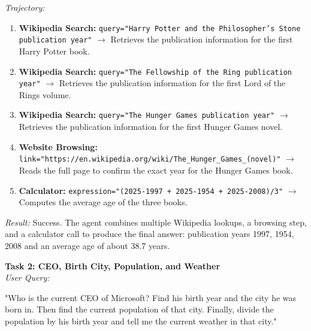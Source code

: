 \documentclass{article}
\begin{document}
\textit{Trajectory:}
\begin{enumerate}
    \item \textbf{Wikipedia Search:} \texttt{query="Harry Potter and the Philosopher's Stone publication year"} $\rightarrow$ Retrieves the publication information for the first Harry Potter book.
    \item \textbf{Wikipedia Search:} \texttt{query="The Fellowship of the Ring publication year"} $\rightarrow$ Retrieves the publication information for the first Lord of the Rings volume.
    \item \textbf{Wikipedia Search:} \texttt{query="The Hunger Games publication year"} $\rightarrow$ Retrieves the publication information for the first Hunger Games novel.
    \item \textbf{Website Browsing:} \texttt{link="https://en.wikipedia.org/wiki/The\_Hunger\_Games\_(novel)"} $\rightarrow$ Reads the full page to confirm the exact year for the Hunger Games book.
    \item \textbf{Calculator:} \texttt{expression="(2025-1997 + 2025-1954 + 2025-2008)/3"} $\rightarrow$ Computes the average age of the three books.
\end{enumerate}

\textit{Result:} Success. The agent combines multiple Wikipedia lookups, a browsing step, and a calculator call to produce the final answer: publication years 1997, 1954, 2008 and an average age of about 38.7 years.

\textbf{Task 2: CEO, Birth City, Population, and Weather} \\
\textit{User Query:} 

"Who is the current CEO of Microsoft? Find his birth year and the city he was born in. Then find the current population of that city. Finally, divide the population by his birth year and tell me the current weather in that city." \\
\end{document}
